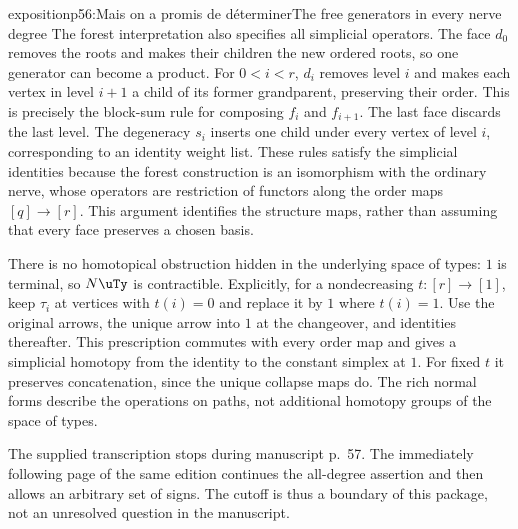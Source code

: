\begin{dcomment}{exposition}{p56:Mais on a promis de déterminer}{The free generators in every nerve degree}
The forest interpretation also specifies all simplicial operators. The face $d_0$ removes the roots and makes their children the new ordered roots, so one generator can become a product. For $0<i<r$, $d_i$ removes level $i$ and makes each vertex in level $i+1$ a child of its former grandparent, preserving their order. This is precisely the block-sum rule for composing $f_i$ and $f_{i+1}$. The last face discards the last level. The degeneracy $s_i$ inserts one child under every vertex of level $i$, corresponding to an identity weight list. These rules satisfy the simplicial identities because the forest construction is an isomorphism with the ordinary nerve, whose operators are restriction of functors along the order maps $[q]\to[r]$. This argument identifies the structure maps, rather than assuming that every face preserves a chosen basis.

There is no homotopical obstruction hidden in the underlying space of types: $1$ is terminal, so $N\uTy$ is contractible. Explicitly, for a nondecreasing $t:[r]\to[1]$, keep $\tau_i$ at vertices with $t(i)=0$ and replace it by $1$ where $t(i)=1$. Use the original arrows, the unique arrow into $1$ at the changeover, and identities thereafter. This prescription commutes with every order map and gives a simplicial homotopy from the identity to the constant simplex at $1$. For fixed $t$ it preserves concatenation, since the unique collapse maps do. The rich normal forms describe the operations on paths, not additional homotopy groups of the space of types.

The supplied transcription stops during manuscript p.~57. The immediately following page of the same edition continues the all-degree assertion and then allows an arbitrary set of signs. The cutoff is thus a boundary of this package, not an unresolved question in the manuscript.
\end{dcomment}


